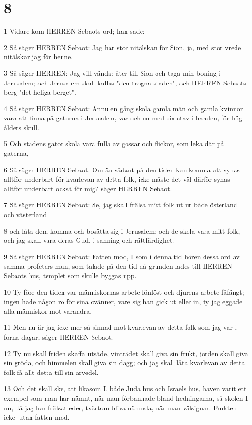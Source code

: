 \chapter{8}

\par 1 Vidare kom HERREN Sebaots ord; han sade:
\par 2 Så säger HERREN Sebaot: Jag har stor nitälskan för Sion, ja, med stor vrede nitälskar jag för henne.
\par 3 Så säger HERREN: Jag vill vända: åter till Sion och taga min boning i Jerusalem; och Jerusalem skall kallas "den trogna staden", och HERREN Sebaots berg "det heliga berget".
\par 4 Så säger HERREN Sebaot: Ännu en gång skola gamla män och gamla kvinnor vara att finna på gatorna i Jerusalem, var och en med sin stav i handen, för hög ålders skull.
\par 5 Och stadens gator skola vara fulla av gossar och flickor, som leka där på gatorna,
\par 6 Så säger HERREN Sebaot. Om än sådant på den tiden kan komma att synas alltför underbart för kvarlevan av detta folk, icke måste det väl därför synas alltför underbart också för mig? säger HERREN Sebaot.
\par 7 Så säger HERREN Sebaot: Se, jag skall frälsa mitt folk ut ur både österland och västerland
\par 8 och låta dem komma och bosätta sig i Jerusalem; och de skola vara mitt folk, och jag skall vara deras Gud, i sanning och rättfärdighet.
\par 9 Så säger HERREN Sebaot: Fatten mod, I som i denna tid hören dessa ord av samma profeters mun, som talade på den tid då grunden lades till HERREN Sebaots hus, templet som skulle byggas upp.
\par 10 Ty före den tiden var människornas arbete lönlöst och djurens arbete fåfängt; ingen hade någon ro för sina ovänner, vare sig han gick ut eller in, ty jag eggade alla människor mot varandra.
\par 11 Men nu är jag icke mer så sinnad mot kvarlevan av detta folk som jag var i forna dagar, säger HERREN Sebaot.
\par 12 Ty nu skall friden skaffa utsäde, vinträdet skall giva sin frukt, jorden skall giva sin gröda, och himmelen skall giva sin dagg; och jag skall låta kvarlevan av detta folk få allt detta till sin arvedel.
\par 13 Och det skall ske, att likasom I, både Juda hus och Israels hus, haven varit ett exempel som man har nämnt, när man förbannade bland hedningarna, så skolen I nu, då jag har frälsat eder, tvärtom bliva nämnda, när man välsignar. Frukten icke, utan fatten mod.
